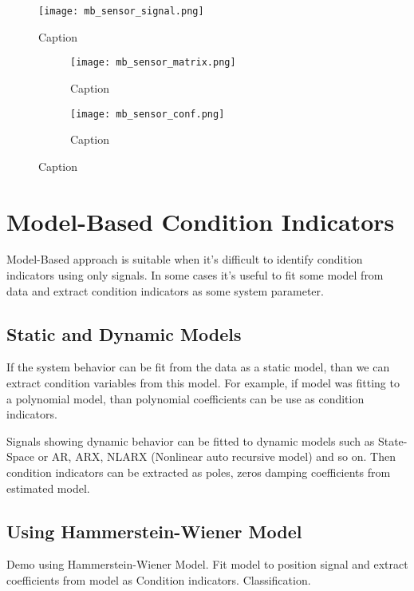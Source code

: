 \begin{figure}[h!]
    \centering
    \texttt{[image: mb\_sensor\_signal.png]}
    \caption{Caption}
    \label{fig:}
\end{figure}

\begin{figure}
    \centering
    \begin{subfigure}[b]{0.45\textwidth}
        \centering
        \texttt{[image: mb\_sensor\_matrix.png]}
        \caption{Caption}
        \label{fig:}
    \end{subfigure}
    \hfill
    \begin{subfigure}[b]{0.45\textwidth}
        \centering
        \texttt{[image: mb\_sensor\_conf.png]}
        \caption{Caption}
        \label{fig:}
    \end{subfigure}
    \caption{Caption}
    \label{fig:}
\end{figure}



\section{Model-Based Condition Indicators}
Model-Based approach is suitable when it's difficult to identify condition
indicators using only signals. In some cases it's useful to fit some model
from data and extract condition indicators as some system parameter.

\subsection{Static and Dynamic Models}
If the system behavior can be fit from the data as a static model, than we
can extract condition variables from this model. For example, if model
was fitting to a polynomial model, than polynomial coefficients can be use
as condition indicators.

Signals showing dynamic behavior can be fitted to dynamic models such as
State-Space or AR, ARX, NLARX (Nonlinear auto recursive model) and so on.
Then condition indicators can be extracted as poles, zeros damping
coefficients from estimated model.

\subsection{Using Hammerstein-Wiener Model}\label{sec:mb_hw_demo}
Demo using Hammerstein-Wiener Model. Fit model to position signal and
extract coefficients from model as Condition indicators. Classification.

